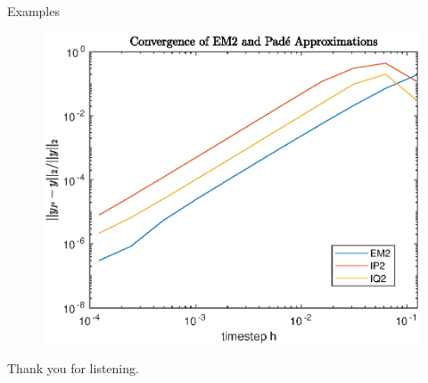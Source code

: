 \documentclass[aspectratio=169]{beamer}
\begin{document}
\begin{frame}{Examples}
	\begin{figure}
		\centering
		\includegraphics[width=0.5\linewidth]{Matlab/positivemapk2.eps}
		\label{fig:pademapkpos}
	\end{figure}
\end{frame}

\begin{frame}
	\centering
	Thank you for listening.
\end{frame}
\end{document}
